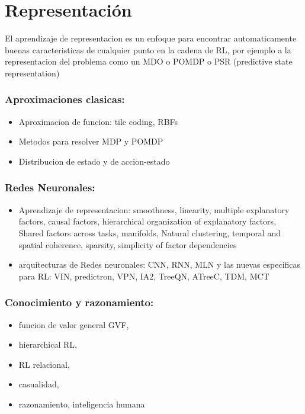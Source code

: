 \documentclass{svproc}
\begin{document}
\section{Representación}
El aprendizaje de representacion es un enfoque para encontrar automaticamente buenas caracteristicas de cualquier punto en la cadena de RL, por ejemplo a la representacion del problema como un MDO o POMDP o PSR (predictive state representation)
\subsubsection{Aproximaciones clasicas:}
\begin{itemize}
    \item Aproximacion de funcion: tile coding, RBFs
    \item Metodos para resolver MDP y POMDP
    \item Distribucion de estado y de accion-estado
\end{itemize}

\subsubsection{Redes Neuronales:}
\begin{itemize}
    \item Aprendizaje de representacion: smoothness, linearity, multiple explanatory factors, causal factors, hierarchical organization of explanatory factors, Shared factors across tasks, manifolds, Natural clustering, temporal and spatial coherence, sparsity, simplicity of factor dependencies
    \item arquitecturas de Redes neuronales: CNN, RNN, MLN y las nuevas especificas para RL: VIN, predictron, VPN, IA2, TreeQN, ATreeC, TDM, MCT
\end{itemize}

\subsubsection{Conocimiento y razonamiento:}
\begin{itemize}
    \item funcion de valor general GVF, 
    \item hierarchical RL, 
    \item RL relacional, 
    \item casualidad, 
    \item razonamiento, inteligencia humana
\end{itemize}
    
\end{document}
